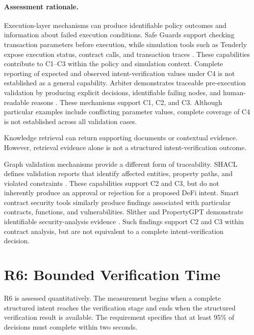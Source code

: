 \paragraph{Assessment rationale.}

Execution-layer mechanisms can produce
identifiable policy outcomes and information
about failed execution conditions.
Safe Guards support checking transaction
parameters before execution, while simulation
tools such as Tenderly expose execution
status, contract calls, and transaction traces
\cite{safeSmartAccountGuards2026,
tenderlyTransactionSimulation2026}.
These capabilities contribute to C1--C3
within the policy and simulation context.
Complete reporting of expected and observed
intent-verification values under C4 is not
established as a general capability. Arbiter demonstrates traceable pre-execution
validation by producing explicit decisions,
identifiable failing nodes, and human-readable
reasons \cite{yaoArbiter2026}.
These mechanisms support C1, C2, and C3.
Although particular examples include conflicting
parameter values, complete coverage of C4
is not established across all validation cases.

Knowledge retrieval can return supporting
documents or contextual evidence. However,
retrieval evidence alone is not a structured
intent-verification outcome.

Graph validation mechanisms provide a
different form of traceability. SHACL defines
validation reports that identify affected
entities, property paths, and violated
constraints \cite{w3cSHACL2017}.
These capabilities support C2 and C3,
but do not inherently produce an approval
or rejection for a proposed DeFi intent. Smart contract security tools similarly
produce findings associated with particular
contracts, functions, and vulnerabilities.
Slither and PropertyGPT demonstrate identifiable
security-analysis evidence
\cite{feistSlither2019,liuPropertyGPT2025}.
Such findings support C2 and C3 within
contract analysis, but are not equivalent
to a complete intent-verification decision.


\section{R6: Bounded Verification Time}

R6 is assessed quantitatively. The measurement
begins when a complete structured intent reaches
the verification stage and ends when the
structured verification result is available.
The requirement specifies that at least 95\%
of decisions must complete within two seconds.

